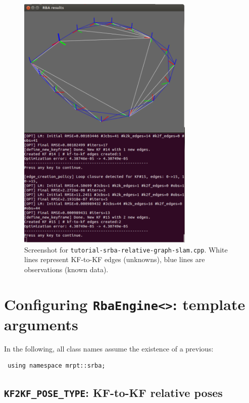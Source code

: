 \documentclass[a4paper,11pt]{article}
\begin{document}
\begin{figure}[h]
\centering
\includegraphics[width=0.75\textwidth]{imgs/screenshot_tutorial_relative-graph-slam-2D.pdf} 
\caption{Screenshot for \texttt{tutorial-srba-relative-graph-slam.cpp}. 
White lines represent KF-to-KF edges (unknowns), blue lines are observations (known data).}
\label{fig:screenshot.tutorial2}
\end{figure}

\newpage

\section{Configuring \texttt{RbaEngine<>}: template arguments}
\label{sect:rba_configs}

In the following, all class names assume the existence of a previous:

\begin{lstlisting}
 using namespace mrpt::srba;
\end{lstlisting}



\subsection{\texttt{KF2KF\_POSE\_TYPE}: KF-to-KF relative poses}
\label{sec:k2k_types}
\end{document}
